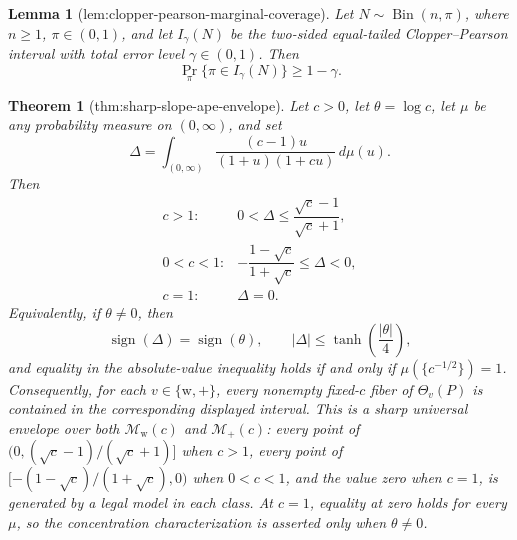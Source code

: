 \documentclass{article}
\newtheorem{theorem}{Theorem}
\newtheorem{lemma}{Lemma}
\begin{document}
\begin{lemma}[lem:clopper-pearson-marginal-coverage]\label{lem:clopper-pearson-marginal-coverage}
Let \(N\sim\operatorname{Bin}(n,\pi)\), where \(n\geq 1\), \(\pi\in(0,1)\), and let \(I_{\gamma}(N)\) be the two-sided equal-tailed Clopper--Pearson interval with total error level \(\gamma\in(0,1)\). Then
\[
 \Pr_{\pi}\{\pi\in I_{\gamma}(N)\}\geq 1-\gamma.
\]
\end{lemma}

\begin{theorem}[thm:sharp-slope-ape-envelope]\label{thm:sharp-slope-ape-envelope}
Let \(c>0\), let \(\theta=\log c\), let \(\mu\) be any probability measure on \((0,\infty)\), and set
\[
 \Delta=\int_{(0,\infty)}\frac{(c-1)u}{(1+u)(1+cu)}\,d\mu(u).
\]
Then
\[
 \begin{array}{ll}
 c>1:&0<\Delta\le \dfrac{\sqrt c-1}{\sqrt c+1},\\[6pt]
 0<c<1:&-\dfrac{1-\sqrt c}{1+\sqrt c}\le\Delta<0,\\[6pt]
 c=1:&\Delta=0.
 \end{array}
\]
Equivalently, if \(\theta\ne0\), then
\[
 \operatorname{sign}(\Delta)=\operatorname{sign}(\theta),
 \qquad
 |\Delta|\le\tanh\!\left(\frac{|\theta|}{4}\right),
\]
and equality in the absolute-value inequality holds if and only if
\(\mu(\{c^{-1/2}\})=1\).  Consequently, for each \(v\in\{\mathrm w,+\}\), every nonempty fixed-\(c\) fiber of \(\Theta_v(P)\) is contained in the corresponding displayed interval.  This is a sharp universal envelope over both \(\mathcal M_{\mathrm w}(c)\) and \(\mathcal M_+(c)\): every point of \((0,(\sqrt c-1)/(\sqrt c+1)]\) when \(c>1\), every point of \([-(1-\sqrt c)/(1+\sqrt c),0)\) when \(0<c<1\), and the value zero when \(c=1\), is generated by a legal model in each class.  At \(c=1\), equality at zero holds for every \(\mu\), so the concentration characterization is asserted only when \(\theta\ne0\).
\end{theorem}
\end{document}
